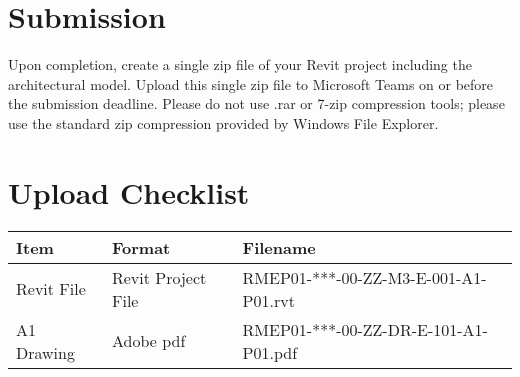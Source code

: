 \section*{Submission}
Upon completion, create a single zip file of your Revit project including the architectural model. Upload this single zip file to Microsoft Teams on or before the submission deadline.  Please do not use .rar or 7-zip compression tools; please use the standard zip compression provided by Windows File Explorer.


\section*{Upload Checklist}

\begin{tabular}{|l|l|l|}
	\hline
	\textbf{Item} & \textbf{Format} & \textbf{Filename} \\
	\hline
	Revit File  & Revit Project File & RMEP01-***-00-ZZ-M3-E-001-A1-P01.rvt  \\
	A1 Drawing  & Adobe pdf & RMEP01-***-00-ZZ-DR-E-101-A1-P01.pdf  \\
	\hline
\end{tabular}



